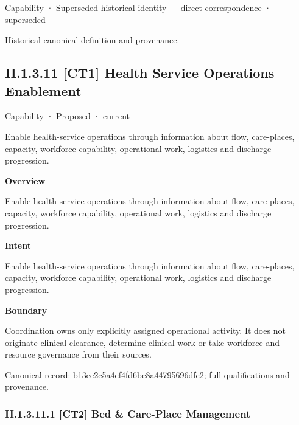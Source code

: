 \label{element:b42afda9e876463ba56fa8f73fe7a32a}
{\small Capability · Superseded historical identity — direct correspondence · superseded}\par
\href{../../../../continuum/strategy/capability/b42afda9e876463ba56fa8f73fe7a32a.md}{Historical canonical definition and provenance}.\par
\subsection*{II.1.3.11 [CT1] Health Service Operations Enablement}
\label{navigation:II.1.3.11}

\label{element:b13ee2c5a4ef4fd6be8a44795696dfc2}
{\small Capability · Proposed · current}\par

Enable health-service operations through information about flow, care-places, capacity, workforce capability, operational work, logistics and discharge progression.



\textbf{Overview}



Enable health-service operations through information about flow, care-places, capacity, workforce capability, operational work, logistics and discharge progression.



\textbf{Intent}



Enable health-service operations through information about flow, care-places, capacity, workforce capability, operational work, logistics and discharge progression.



\textbf{Boundary}



Coordination owns only explicitly assigned operational activity. It does not originate clinical clearance, determine clinical work or take workforce and resource governance from their sources.


{\footnotesize \href{../../../../continuum/strategy/capability/b13ee2c5a4ef4fd6be8a44795696dfc2.md}{Canonical record: b13ee2c5a4ef4fd6be8a44795696dfc2}; full qualifications and provenance.}\par
\subsubsection*{II.1.3.11.1 [CT2] Bed \& Care-Place Management}
\label{navigation:II.1.3.11.1}

